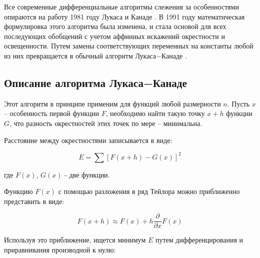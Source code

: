 Все современные дифференциальные алгоритмы слежения за особенностями опираются на работу 1981 году Лукаса и Канаде \cite{lyka_kan}. В 1991 году математическая формулировка этого алгоритма была изменена, и стала основой для всех последующих обобщений с учетом аффинных искажений окрестности и освещенности. Путем замены соответствующих переменных на константы любой из них превращается в обычный алгоритм Лукаса−Канаде \cite{lk_jou}.


\subsection{Описание алгоритма Лукаса−Канаде}

Этот алгоритм в принципе применим для функций любой размерности $n$. Пусть $x$ – особенность первой функции $F$, необходимо найти такую точку $x+h$ функции $G$, что разность окрестностей этих точек по мере – минимальна.

Расстояние между окрестностями записывается в виде:

\begin{equation}
E=\sum [F(x+h)-G(x)]^2
\end{equation}

где $F(x)$, $G(x)$ - две функции.

Функцию $F(x)$ с помощью разложения в ряд Тейлора можно приближенно представить в виде:

\begin{equation}
F(x+h)\approx F(x)+h\frac{\partial}{\partial x}F(x)
\end{equation}

Используя это приближение, ищется минимум $E$ путем дифференцирования и приравнивания производной к нулю:


